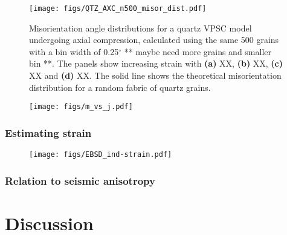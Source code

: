 \documentclass[a4paper,12pt]{report}
\numberwithin{equation}{chapter}
\begin{document}
\begin{figure}[h]
  \centering
    \texttt{[image: figs/QTZ\_AXC\_n500\_misor\_dist.pdf]}
  \caption[Misorientation angle distribution (quartz VPSC)]{Misorientation angle distributions for a quartz VPSC model undergoing axial compression, calculated using the same 500 grains with a bin width of 0.25$^{\circ}$ ** maybe need more grains and smaller bin **. The panels show increasing strain with \textbf{(a)} XX, \textbf{(b)} XX, \textbf{(c)} XX and \textbf{(d)} XX. The solid line shows the theoretical misorientation distribution for a random fabric of quartz grains.} 
  \label{fig:qtz_misorientation_dist}
\end{figure} 

\begin{figure}[h]
  \centering
    \texttt{[image: figs/m\_vs\_j.pdf]}
  \caption[Relationship of M- and J-indices]{} 
  \label{fig:m_vs_j}
\end{figure} 
  

\subsection{Estimating strain}

\begin{figure}[h]
  \centering
    \texttt{[image: figs/EBSD\_ind-strain.pdf]}
  \caption[Relationship of indices to strain (quartz EBSD)]{} 
  \label{fig:indices_vs_strain_qtz_EBSD}
\end{figure} 

\subsection{Relation to seismic anisotropy}
 
\chapter{Discussion} \label{chap:discussion}
\vspace{-1cm}
\end{document}
